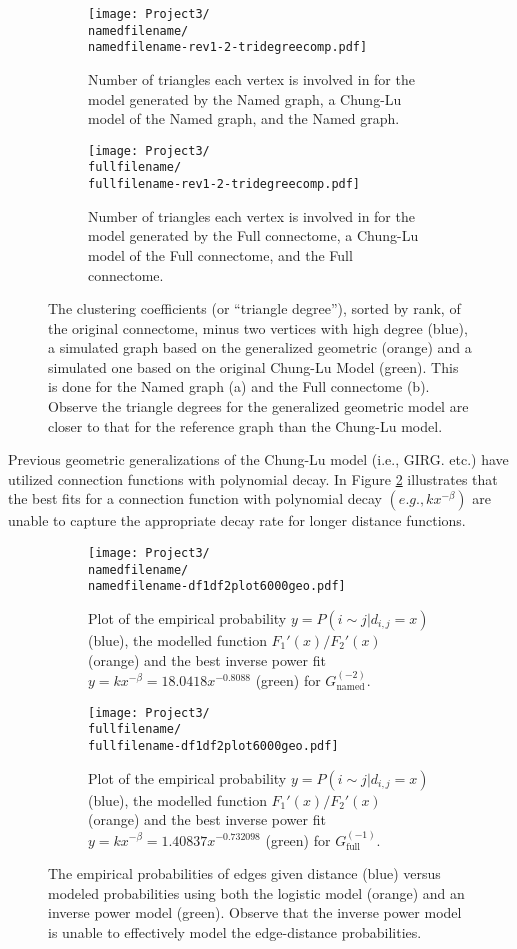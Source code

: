 \documentclass[11]{article}
\newcommand{\namedfilename}{namedminus2-2p}
\newcommand{\fullfilename}{fullminus1-2p}
\newcommand{\namedtwo}{G_{\textrm{named}}^{(-2)}}
\newcommand{\fullone}{G_{\textrm{full}}^{(-1)}}
\theoremstyle{remark}
\theoremstyle{definition}
\begin{document}
\begin{figure} [h!]
  \centering
    \begin{subfigure}[t]{0.4\linewidth}
    \texttt{[image: Project3/\\namedfilename/\\namedfilename-rev1-2-tridegreecomp.pdf]}
    \caption{Number of triangles each vertex is involved in for the model generated by the Named graph, a Chung-Lu model of the Named graph, and the Named graph. } 
    \end{subfigure} \hfill
    \begin{subfigure}[t]{0.4\linewidth}
    \texttt{[image: Project3/\\fullfilename/\\fullfilename-rev1-2-tridegreecomp.pdf]}
    \caption{Number of triangles each vertex is involved in for the model generated by the Full connectome, a Chung-Lu model of the Full connectome, and the Full connectome.}
    \end{subfigure} \hfill
  \caption{The clustering coefficients (or ``triangle degree''), sorted by rank, of the original connectome, minus two vertices with high degree (blue), a simulated graph based on the generalized geometric (orange) and a simulated one based on the original Chung-Lu Model (green). This is done for the Named graph (a) and the Full connectome (b). Observe the triangle degrees for the generalized geometric model are closer to that for the reference graph than the Chung-Lu model. }
  \label{fig:trianglecomparison}
\end{figure}



Previous geometric generalizations of the Chung-Lu model (i.e., GIRG. etc.) have utilized connection functions with polynomial decay. In Figure \ref{fig:polycompare} illustrates that the best fits for a connection function with polynomial decay $(e.g., k x^{-\beta})$ are unable to capture the appropriate decay rate for longer distance functions.


\begin{figure} [h!]
\centering
\begin{subfigure}[t]{0.4\linewidth}
\texttt{[image: Project3/\\namedfilename/\\namedfilename-df1df2plot6000geo.pdf]} 
\caption{Plot of the empirical probability $y=P(i\sim j | d_{i,j} = x)$ (blue), the modelled function $F_1'(x)/F_2'(x)$ (orange) and the best inverse power fit $y= k x^{-\beta} = 18.0418 x^{-0.8088}$ (green) for $\namedtwo$.}
\end{subfigure} \hfill
\begin{subfigure}[t]{0.4\linewidth}
\texttt{[image: Project3/\\fullfilename/\\fullfilename-df1df2plot6000geo.pdf]}
\caption{Plot of the empirical probability $y=P(i\sim j | d_{i,j} = x)$ (blue), the modelled function $F_1'(x)/F_2'(x)$ (orange) and the best inverse power fit $y= k x^{-\beta} = 1.40837 x^{-0.732098}$ (green) for $\fullone$.}
\end{subfigure} \hfill
\caption{The empirical probabilities of edges given distance (blue) versus modeled probabilities using both the logistic model (orange) and an inverse power model (green). Observe that the inverse power model is unable to effectively model the edge-distance probabilities.}
\label{fig:polycompare}
\end{figure}
\end{document}
